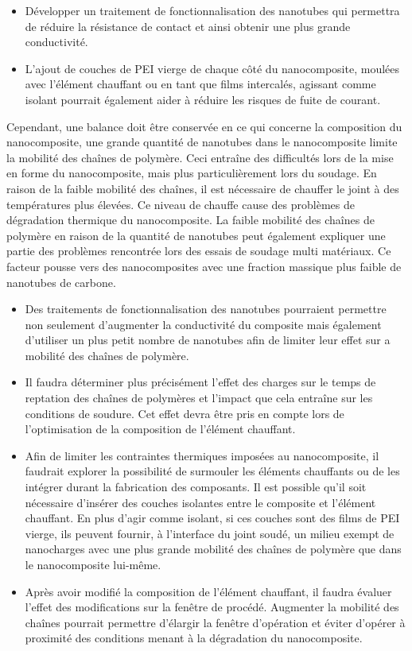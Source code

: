 \begin{itemize}
	\item Développer un traitement de fonctionnalisation des nanotubes qui permettra de réduire la résistance de contact et ainsi obtenir une plus grande conductivité.  
	\item L'ajout de couches de PEI vierge de chaque côté du nanocomposite, moulées avec l'élément chauffant ou en tant que films intercalés, agissant comme isolant pourrait également aider à réduire les risques de fuite de courant. 
\end{itemize}

Cependant, une balance doit être conservée en ce qui concerne la composition du nanocomposite, une grande quantité de nanotubes dans le nanocomposite limite la mobilité des chaînes de polymère. 
Ceci entraîne des difficultés lors de la mise en forme du nanocomposite, mais plus particulièrement lors du soudage.
En raison de la faible mobilité des chaînes, il est nécessaire de chauffer le joint à des températures plus élevées. 
Ce niveau de chauffe cause des problèmes de dégradation thermique du nanocomposite. 
La faible mobilité des chaînes de polymère en raison de la quantité de nanotubes peut également expliquer une partie des problèmes rencontrée lors des essais de soudage multi matériaux. 
Ce facteur pousse vers des nanocomposites avec une fraction massique plus faible de nanotubes de carbone. 

\begin{itemize}
	\item Des traitements de fonctionnalisation des nanotubes pourraient permettre non seulement d'augmenter la conductivité du composite mais également d'utiliser un plus petit nombre de nanotubes afin de limiter leur effet sur a mobilité des chaînes de polymère. 
	\item Il faudra déterminer plus précisément l'effet des charges sur le temps de reptation des chaînes de polymères et l'impact que cela entraîne sur les conditions de soudure. 
	Cet effet devra être pris en compte lors de l'optimisation de la composition de l'élément chauffant. 
	\item Afin de limiter les contraintes thermiques imposées au nanocomposite, il faudrait explorer la possibilité de surmouler les éléments chauffants ou de les intégrer durant la fabrication des composants. 
	Il est possible qu'il soit nécessaire d'insérer des couches isolantes entre le composite et l'élément chauffant. 
	En plus d'agir comme isolant, si ces couches sont des films de PEI vierge, ils peuvent fournir, à l'interface du joint soudé, un milieu exempt de nanocharges avec une plus grande mobilité des chaînes de polymère que dans le nanocomposite lui-même. 
	\item Après avoir modifié la composition de l'élément chauffant, il faudra évaluer l'effet  des modifications sur la fenêtre de procédé. 
	Augmenter la mobilité des chaînes pourrait permettre d'élargir la fenêtre d'opération et éviter d'opérer à proximité des conditions menant à la dégradation du nanocomposite. 
\end{itemize}

